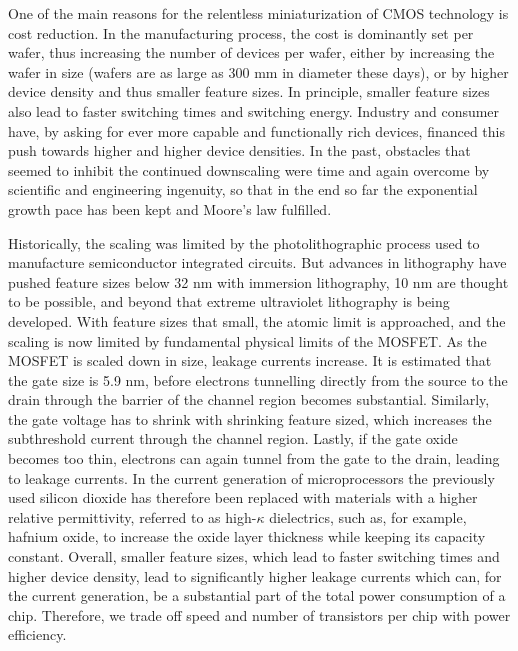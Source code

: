 One of the main reasons for the relentless miniaturization of CMOS technology is
cost reduction. In the manufacturing process, the cost is dominantly set per
wafer, thus increasing the number of devices per wafer, either by increasing the
wafer in size (wafers are as large as 300 mm in diameter these days), or by
higher device density and thus smaller feature sizes. In principle, smaller
feature sizes also lead to faster switching times and switching energy. Industry
and consumer have, by asking for ever more capable and functionally rich
devices, financed this push towards higher and higher device densities. In the
past, obstacles that seemed to inhibit the continued downscaling were time and
again overcome by scientific and engineering ingenuity, so that in the end so
far the exponential growth pace has been kept and Moore's law fulfilled.

Historically, the scaling was limited by the photolithographic process used to
manufacture semiconductor integrated circuits. But advances in lithography have
pushed feature sizes below 32 nm with immersion lithography, 10 nm are thought
to be possible, and beyond that extreme ultraviolet lithography is being developed.
With feature sizes that small, the atomic limit is approached, and the scaling
is now limited by fundamental physical limits of the MOSFET. As the MOSFET is
scaled down in size, leakage currents increase. It is estimated that the gate
size is 5.9 nm, before electrons tunnelling directly from the source to
the drain through the barrier of the channel region becomes substantial.
Similarly, the gate voltage has to shrink with shrinking feature sized, which
increases the subthreshold current through the channel region. Lastly, if the
gate oxide becomes too thin, electrons can again tunnel from the gate to the
drain, leading to leakage currents. In the current generation of microprocessors
the previously used silicon dioxide has therefore been replaced with materials
with a higher relative permittivity, referred to as high-$\kappa$ dielectrics,
such as, for example, hafnium oxide, to increase the oxide layer thickness while
keeping its capacity constant. Overall, smaller feature sizes, which lead to
faster switching times and higher device density, lead to
significantly higher leakage currents which can, for the current generation, be
a substantial part of the total power consumption of a chip. Therefore, we
trade off speed and number of transistors per chip with power efficiency.

